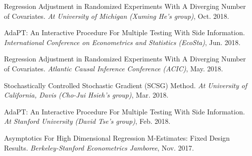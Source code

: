 \documentclass{article}
\begin{document}
\vspace{2mm}
Regression Adjustment in Randomized Experiments With A Diverging Number of Covariates. \emph{At University of Michigan (Xuming He's group)}, Oct. 2018.

\vspace{2mm}
AdaPT: An Interactive Procedure For Multiple Testing With Side Information. \emph{International Conference on Econometrics and Statistics (EcoSta)}, Jun. 2018.

\vspace{2mm}
Regression Adjustment in Randomized Experiments With A Diverging Number of Covariates. \emph{Atlantic Causal Inference Conference (ACIC)}, May. 2018.

\vspace{2mm}
Stochastically Controlled Stochastic Gradient (SCSG) Method. \emph{At University of California, Davis (Cho-Jui Hsieh's group)}, Mar. 2018.

\vspace{2mm}
AdaPT: An Interactive Procedure For Multiple Testing With Side Information. \emph{At Stanford University (David Tse's group)}, Feb. 2018.

\vspace{2mm}
Asymptotics For High Dimensional Regression M-Estimates: Fixed Design Results. \emph{Berkeley-Stanford Econometrics Jamboree}, Nov. 2017. 

\vspace{5mm}







\end{document}
